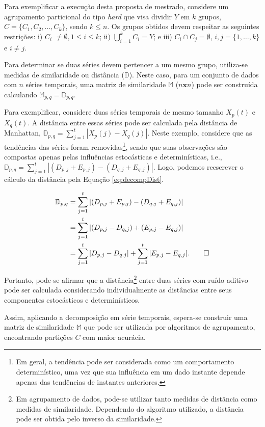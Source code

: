 Para exemplificar a execução desta proposta de mestrado, considere um agrupamento particional do tipo \emph{hard} que visa dividir $Y$ em $k$ grupos, $C = \{C_1, C_2, \dots, C_k\}$, sendo $k \leq n$. Os grupos obtidos devem respeitar as seguintes restrições: i) $C_i$ $\neq \emptyset, 1 \leq i \leq k$; ii) $\bigcup_{i=1}^{k} C_i = Y$; e iii) $C_i \cap C_j = \emptyset$, $i,j = \{1, \dots, k\}$ e $i \neq j$.

Para determinar se duas séries devem pertencer a um mesmo grupo, utiliza-se medidas de similaridade ou distância ($\mathbb{D}$). Neste caso, para um conjunto de dados com $n$ séries temporais, uma matriz de similaridade $\mathbb{M}$ ($n\textbf{x}n$) pode ser construída calculando $\mathbb{M}_{p,q} = \mathbb{D}_{p,q}$.

Para exemplificar, considere duas séries temporais de mesmo tamanho $X_p(t)$ e $X_q(t)$. A distância entre essas séries pode ser calculada pela distância de Manhattan, $\mathbb{D}_{p,q} = \sum_{j=1}^{t} |X_p(j) - X_q(j)|$. Neste exemplo, considere que as tendências das séries foram removidas\footnote{Em geral, a tendência pode ser considerada como um comportamento determinístico, uma vez que sua influência em um dado instante depende apenas das tendências de instantes anteriores.}, sendo que suas observações são compostas apenas pelas influências estocásticas e determinísticas, i.e., $\mathbb{D}_{p,q} = \sum_{j=1}^{t} |(D_{p,j} + E_{p,j}) - (D_{q,j} + E_{q,j})|$. Logo, podemos reescrever o cálculo da distância pela Equação \ref{eq:decompDist}.

\begin{align}\label{eq:decompDist}
\mathbb{D}_{p,q}&=\sum_{j=1}^{t} |(D_{p,j} + E_{p,j}) - (D_{q,j} + E_{q,j})| \nonumber\\
       &=\sum_{j=1}^{t} |(D_{p,j} - D_{q,j}) + (E_{p,j} - E_{q,j})|\nonumber \\
       &=\sum_{j=1}^{t} |D_{p,j} - D_{q,j}| + \sum_{j=1}^{t} |E_{p,j} - E_{q,j}|.\qedhere
\end{align}


Portanto, pode-se afirmar que a distância\footnote{Em agrupamento de dados, pode-se utilizar tanto medidas de distância como medidas de similaridade. Dependendo do algoritmo utilizado, a distância pode ser obtida pelo inverso da similaridade.} entre duas séries com ruído aditivo pode ser calculada considerando individualmente as distâncias entre seus componentes estocásticos e determinísticos.

Assim, aplicando a decomposição em série temporais, espera-se construir uma matriz de similaridade $\mathbb{M}$  que pode ser utilizada por algoritmos de agrupamento, encontrando partições $C$ com maior acurácia.

